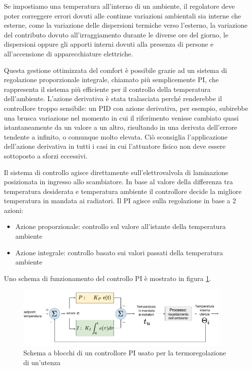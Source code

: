 \documentclass[laurea,oneside,11pt]{USiena_tesiLM}
\begin{document}
Se impostiamo una temperatura all'interno di un ambiente, il regolatore deve poter correggere errori dovuti alle continue variazioni ambientali sia interne che esterne, come la variazione delle dispersioni termiche verso l'esterno, la variazione del contributo dovuto all'irraggiamento durante le diverse ore del giorno, le dispersioni oppure gli apporti interni dovuti alla presenza di persone e all'accensione di apparecchiature elettriche.

Questa gestione ottimizzata  del comfort è possibile grazie ad un sistema di regolazione proporzionale integrale, chiamato più semplicemente PI, che rappresenta il sistema più efficiente per il controllo della temperatura dell'ambiente. L'azione derivativa è stata tralasciata perché renderebbe il controllore troppo sensibile: un PID con azione derivativa, per esempio, subirebbe una brusca variazione nel momento in cui il riferimento venisse cambiato quasi istantaneamente da un valore a un altro, risultando in una derivata dell'errore tendente a infinito, o comunque molto elevata. Ciò sconsiglia l'applicazione dell'azione derivativa in tutti i casi in cui l'attuatore fisico non deve essere sottoposto a sforzi eccessivi.

Il sistema di controllo agisce direttamente sull'elettrovalvola di laminazione posizionata in ingresso allo scambiatore. In base al valore della differenza tra temperatura desiderata e temperatura ambiente il controllore decide la migliore temperatura in mandata ai radiatori. Il PI agisce sulla regolazione in base a 2 azioni:
\begin{itemize}
\item Azione proporzionale: controllo sul valore all'istante della temperatura ambiente
\item  Azione integrale: controllo basato sui valori passati della temperatura ambiente
\end{itemize}
Uno schema di funzionamento del controllo PI è mostrato in figura \ref{fig:PI}.

\begin{figure}[!ht]
\centering
\includegraphics[width=0.95\textwidth]{figure/PI} 
\caption{Schema a blocchi di un controllore PI usato per la termoregolazione di un'utenza}
\label{fig:PI}
\end{figure}
   
\end{document}
